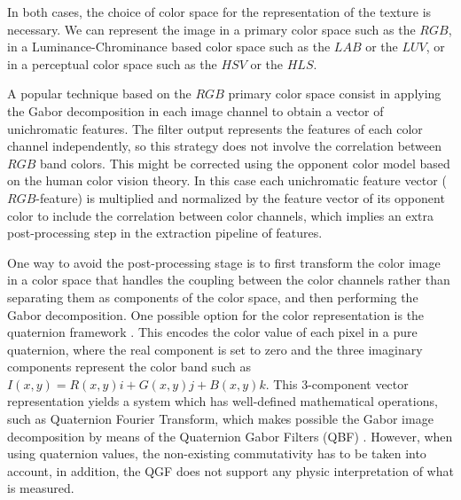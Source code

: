 In both cases, the choice of color space for the representation of the texture is necessary. We can represent the image in a primary color space such as the $RGB$, in a Luminance-Chrominance based color space such as the $LAB$ or the $LUV$, or in a perceptual color space such as the $HSV$ or the $HLS$. 

A popular technique based on the $RGB$ primary color space consist in applying the Gabor decomposition in each image channel to obtain a vector of unichromatic features. The filter output represents the features of each color channel independently, so this strategy does not involve the correlation between $RGB$ band colors. This might be corrected using the opponent color model based on the human color vision theory. In this case each unichromatic feature vector ($RGB$-feature) is multiplied and normalized by the feature vector of its opponent color to include the correlation between color channels, which implies an extra post-processing step in the extraction pipeline of features.

One way to avoid the post-processing stage is to first transform the color image in a color space that handles the coupling between the color channels rather than separating them as components of the color space, and then performing the Gabor decomposition. One possible option for the color representation is the quaternion framework \cite{Sangwine.Ell:VISP:2000}. This encodes the color value of each pixel in a pure quaternion, where the real component is set to zero and the three imaginary components represent the color band such as $I(x, y) = R (x, y) i + G (x, y) j + B (x, y) k $. This 3-component vector representation yields a system which has well-defined mathematical operations, such as Quaternion Fourier Transform, which makes possible the Gabor image decomposition by means of the Quaternion Gabor Filters (QBF) \cite{Subakan.Vemuri:EMMCVPR:2009}. However, when using quaternion values, the non-existing commutativity has to be taken into account, in addition, the QGF does not support any physic interpretation of what is measured.






